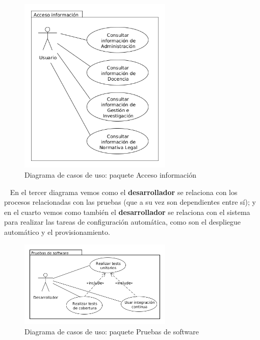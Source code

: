 \begin{figure}[!ht]
  \begin{center}
  \includegraphics[width=0.65\textwidth]{../images/diag_cu_ai.png}
  \caption{Diagrama de casos de uso: paquete Acceso información}
  \label{fig:diag_cu_ai}
  \end{center}
\end{figure}

\newpage
\
\newpage
En el tercer diagrama vemos como el \textbf{desarrollador} se relaciona con los procesos relacionadas con las pruebas (que a su vez son dependientes entre sí); y en el cuarto vemos como también el \textbf{desarrollador} se relaciona con el sistema para realizar las tareas de configuración automática, como son el despliegue automático y el provisionamiento.

\begin{figure}[!ht]
  \begin{center}
  \includegraphics[width=0.65\textwidth]{../images/diag_cu_ps.png}
  \caption{Diagrama de casos de uso: paquete Pruebas de software}
  \label{fig:diag_cu_ps}
  \end{center}
\end{figure}

